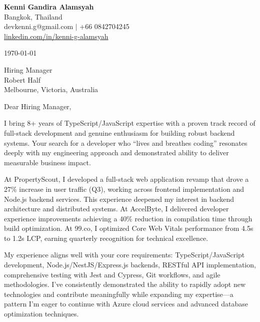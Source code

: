 \documentclass[11pt]{article}
\begin{document}
\begin{center}
{\Large \textbf{Kenni Gandira Alamsyah}}\\[0.3em]
Bangkok, Thailand \\[0.2em]
devkenni.g@gmail.com $\mid$ +66 0842704245 \\[0.2em]
\href{https://www.linkedin.com/in/kenni-g-alamsyah/}{linkedin.com/in/kenni-g-alamsyah}
\end{center}

\vspace{1.5em}

\noindent
\today

\vspace{1.5em}

\noindent
Hiring Manager \\
Robert Half \\
Melbourne, Victoria, Australia

\vspace{1.5em}

\noindent
Dear Hiring Manager,

\vspace{1em}

I bring 8+ years of TypeScript/JavaScript expertise with a proven track record of full-stack development and genuine enthusiasm for building robust backend systems. Your search for a developer who ``lives and breathes coding'' resonates deeply with my engineering approach and demonstrated ability to deliver measurable business impact.

At PropertyScout, I developed a full-stack web application revamp that drove a 27\% increase in user traffic (Q3), working across frontend implementation and Node.js backend services. This experience deepened my interest in backend architecture and distributed systems. At AccelByte, I delivered developer experience improvements achieving a 40\% reduction in compilation time through build optimization. At 99.co, I optimized Core Web Vitals performance from 4.5s to 1.2s LCP, earning quarterly recognition for technical excellence.

My experience aligns well with your core requirements: TypeScript/JavaScript development, Node.js/NestJS/Express.js backends, RESTful API implementation, comprehensive testing with Jest and Cypress, Git workflows, and agile methodologies. I've consistently demonstrated the ability to rapidly adopt new technologies and contribute meaningfully while expanding my expertise---a pattern I'm eager to continue with Azure cloud services and advanced database optimization techniques.
\end{document}
